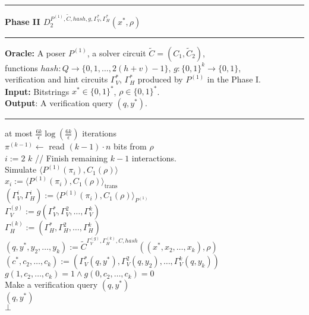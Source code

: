 \begin{codeblock}
  \medskip \hrule \medskip
  \textbf{Phase II $D_2^{P^{(1)}, \widetilde{C}, hash, g, \Gamma_V^*, \Gamma_H^*}(x^*, \rho)$}
  \medskip \hrule \medskip
  \textbf{Oracle:} A poser $P^{(1)}$, a solver circuit $\widetilde{C} = (C_1, \widetilde{C}_2)$, \\
  \IndII functions $hash : Q \rightarrow \{0,1, \dots, 2(h+v)-1\}$, $g:\{0,1\}^k \rightarrow \{0,1\}$, \\
  \IndII verification and hint circuits $\Gamma_V^{*}$, $\Gamma_H^{*}$ produced by $P^{(1)}$ in the Phase I. \\
  \textbf{Input:} Bitstrings $x^* \in \{0,1\}^{*}$, $\rho \in \{0,1\}^{*}$.\\
  \textbf{Output}: A verification query $(q, y^*)$.
  \medskip \hrule \medskip
  \For at most $\frac{6k}{\epsilon} \log(\frac{6k}{\epsilon})$ iterations \Do \\
  \IndI $\pi^{(k-1)} \leftarrow$ read $(k-1)\cdot n$ bits from $\rho$ \\
  \IndI \For $i:=2$ \To $k$ \Do \IndIII // Finish remaining $k-1$ interactions. \\
  \IndII Simulate $\langle P^{(1)}(\pi_i), C_1(\rho)\rangle$ \\
  \IndIII $ x_i := \langle P^{(1)}(\pi_i), C_1(\rho)\rangle_{\text{trans}}$ \\
  \IndIII $(\Gamma_V^{i}, \Gamma_H^{i}) := \langle P^{(1)}(\pi_i), C_1(\rho) \rangle_{P^{(1)}}$ \\
  \IndI $\Gamma_V^{(g)} := g(\Gamma_V^{*}, \Gamma_V^{2}, \dots, \Gamma_V^{k})$  \\
  \IndI  $\Gamma_H^{(k)} := (\Gamma_H^{*}, \Gamma_H^{2}, \dots, \Gamma_H^{k})$ \\
  \IndI $(q, y^*, y_2, \dots, y_k) := \widetilde{C}^{\Gamma_V^{(g)}, \Gamma_H^{(k)}, C, hash}((x^*, x_2, \dots, x_k), \rho)$\\
  \IndI $(c^*, c_2, \dots, c_k) := (\Gamma_V^*(q, y^*), \Gamma_V^2(q, y_2), \dots, \Gamma_V^{k}(q, y_k))$ \\
  \IndI \If $g(1, c_{2}, \dots, c_k) = 1 \land g(0,c_{2}, \dots, c_k) = 0$ \Then \\
  \IndII Make a verification query $(q, y^*)$ \\
  \IndII \Return $(q, y^*)$ \\
  \Return $\bot$
%
\end{codeblock}
%
